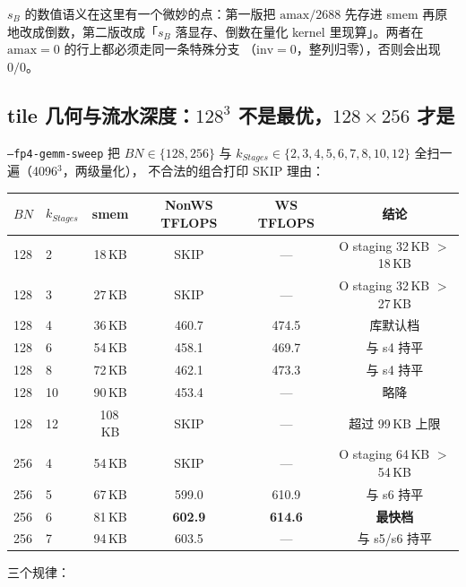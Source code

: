 $s_B$ 的数值语义在这里有一个微妙的点：第一版把 $\mathrm{amax}/2688$
先存进 smem 再原地改成倒数，第二版改成「$s_B$ 落显存、倒数在量化 kernel
里现算」。两者在 $\mathrm{amax}=0$ 的行上都必须走同一条特殊分支
（$\mathrm{inv}=0$，整列归零），否则会出现 $0/0$。

\subsection{tile 几何与流水深度：$128^3$ 不是最优，$128\times256$ 才是}

\texttt{--fp4-gemm-sweep} 把 $BN\in\{128,256\}$ 与
$k_{Stages}\in\{2,3,4,5,6,7,8,10,12\}$ 全扫一遍（4096$^3$，两级量化），
不合法的组合打印 SKIP 理由：

\begin{center}
\footnotesize
\begin{tabular}{llcccc}
\toprule
$BN$ & $k_{Stages}$ & smem & NonWS TFLOPS & WS TFLOPS & 结论 \\
\midrule
128 & 2  & 18\,KB & SKIP & --- & O staging 32\,KB $>$ 18\,KB \\
128 & 3  & 27\,KB & SKIP & --- & O staging 32\,KB $>$ 27\,KB \\
128 & 4  & 36\,KB & 460.7 & 474.5 & 库默认档 \\
128 & 6  & 54\,KB & 458.1 & 469.7 & 与 s4 持平 \\
128 & 8  & 72\,KB & 462.1 & 473.3 & 与 s4 持平 \\
128 & 10 & 90\,KB & 453.4 & --- & 略降 \\
128 & 12 & 108\,KB & SKIP & --- & 超过 99\,KB 上限 \\
256 & 4  & 54\,KB & SKIP & --- & O staging 64\,KB $>$ 54\,KB \\
256 & 5  & 67\,KB & 599.0 & 610.9 & 与 s6 持平 \\
256 & 6  & 81\,KB & \textbf{602.9} & \textbf{614.6} & \textbf{最快档} \\
256 & 7  & 94\,KB & 603.5 & --- & 与 s5/s6 持平 \\
\bottomrule
\end{tabular}
\end{center}

三个规律：

